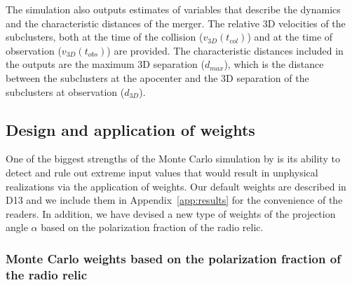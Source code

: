 The simulation also outputs estimates of variables that describe
the dynamics and the characteristic distances of the merger. The relative
3D velocities of the subclusters, both at the time of the
collision ($v_{3D}(t_{col})$) and at the time of observation
($v_{3D}(t_{obs})$) are provided. The characteristic
distances included in the outputs are the maximum 3D separation ($d_{max}$),
which is the distance between the subclusters at
the apocenter and the 3D separation of the subclusters at observation
($d_{3D}$). 
\subsection{Design and application of weights} 
\label{sec:priors}
%
One of the biggest strengths of the Monte Carlo simulation by
 is its ability to detect and rule out extreme input values that would result in
unphysical realizations via the application of weights. 
Our default weights are described in D13 and we include them in
Appendix~\ref{app:results} for the convenience of the readers. 
In addition, we have devised a new type of weights of the projection angle $\alpha$
based on the polarization fraction of the radio relic.

\subsubsection{Monte Carlo weights based on the polarization fraction of the radio relic}
%

